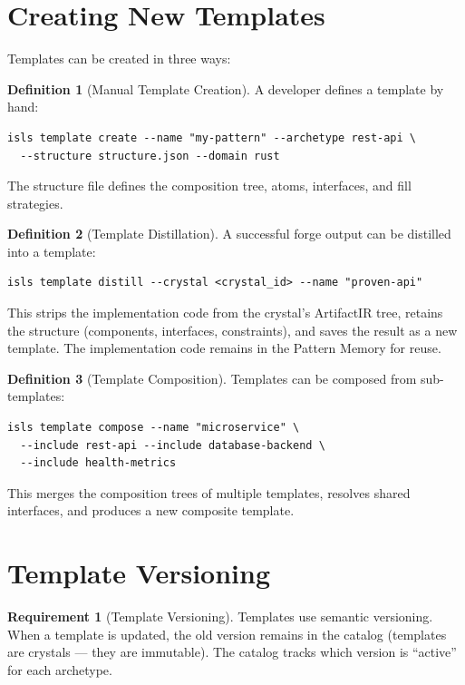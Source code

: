 \documentclass[11pt,a4paper,twoside]{article}
\theoremstyle{definition}
\newtheorem{definition}{Definition}[section]
\newtheorem{requirement}{Requirement}[section]
\theoremstyle{plain}
\theoremstyle{remark}
\begin{document}
\section{Creating New Templates}\label{sec:create}

Templates can be created in three ways:

\begin{definition}[Manual Template Creation]\label{def:manual}
A developer defines a template by hand:
\begin{lstlisting}
isls template create --name "my-pattern" --archetype rest-api \
  --structure structure.json --domain rust
\end{lstlisting}
The structure file defines the composition tree, atoms, interfaces,
and fill strategies.
\end{definition}

\begin{definition}[Template Distillation]\label{def:distill}
A successful forge output can be distilled into a template:
\begin{lstlisting}
isls template distill --crystal <crystal_id> --name "proven-api"
\end{lstlisting}
This strips the implementation code from the crystal's ArtifactIR
tree, retains the structure (components, interfaces, constraints),
and saves the result as a new template. The implementation code
remains in the Pattern Memory for reuse.
\end{definition}

\begin{definition}[Template Composition]\label{def:compose}
Templates can be composed from sub-templates:
\begin{lstlisting}
isls template compose --name "microservice" \
  --include rest-api --include database-backend \
  --include health-metrics
\end{lstlisting}
This merges the composition trees of multiple templates, resolves
shared interfaces, and produces a new composite template.
\end{definition}


\section{Template Versioning}\label{sec:version}

\begin{requirement}[Template Versioning]\label{req:version}
Templates use semantic versioning. When a template is updated, the
old version remains in the catalog (templates are crystals --- they
are immutable). The catalog tracks which version is ``active'' for
each archetype.
\end{requirement}
\end{document}
